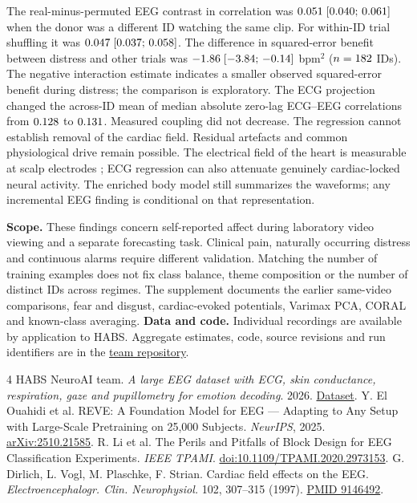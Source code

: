 \documentclass[10pt,a4paper]{article}
\begin{document}
The real-minus-permuted EEG contrast in correlation was $0.051\;[0.040;\,0.061]$ when the donor was a different ID watching the same clip. For within-ID trial shuffling it was $0.047\;[0.037;\,0.058]$. The difference in squared-error benefit between distress and other trials was $-1.86\;[-3.84;\,-0.14]$ bpm$^2$ ($n=182$ IDs). The negative interaction estimate indicates a smaller observed squared-error benefit during distress; the comparison is exploratory. The ECG projection changed the across-ID mean of median absolute zero-lag ECG--EEG correlations from $0.128$ to $0.131$. Measured coupling did not decrease. The regression cannot establish removal of the cardiac field. Residual artefacts and common physiological drive remain possible. The electrical field of the heart is measurable at scalp electrodes \cite{dirlich}; ECG regression can also attenuate genuinely cardiac-locked neural activity. The enriched body model still summarizes the waveforms; any incremental EEG finding is conditional on that representation.

\textbf{Scope.} These findings concern self-reported affect during laboratory video viewing and a separate forecasting task. Clinical pain, naturally occurring distress and continuous alarms require different validation. Matching the number of training examples does not fix class balance, theme composition or the number of distinct IDs across regimes. The supplement documents the earlier same-video comparisons, fear and disgust, cardiac-evoked potentials, Varimax PCA, CORAL and known-class averaging.
\textbf{Data and code.} Individual recordings are available by application to HABS. Aggregate estimates, code, source revisions and run identifiers are in the \href{https://github.com/mathiaschebbah/habs}{team repository}.
\begin{thebibliography}{4}\small
{} HABS NeuroAI team. \emph{A large EEG dataset with ECG, skin conductance, respiration, gaze and pupillometry for emotion decoding}. 2026. \href{https://huggingface.co/datasets/HABSteam/multimodal-eeg-emotion}{Dataset}.
 Y. El Ouahidi et al. REVE: A Foundation Model for EEG --- Adapting to Any Setup with Large-Scale Pretraining on 25,000 Subjects. \emph{NeurIPS}, 2025. \href{https://arxiv.org/abs/2510.21585}{arXiv:2510.21585}.
 R. Li et al. The Perils and Pitfalls of Block Design for EEG Classification Experiments. \emph{IEEE TPAMI}. \href{https://doi.org/10.1109/TPAMI.2020.2973153}{doi:10.1109/TPAMI.2020.2973153}.
 G. Dirlich, L. Vogl, M. Plaschke, F. Strian. Cardiac field effects on the EEG. \emph{Electroencephalogr. Clin. Neurophysiol.} 102, 307--315 (1997). \href{https://pubmed.ncbi.nlm.nih.gov/9146492/}{PMID 9146492}.
\end{thebibliography}
\end{document}
